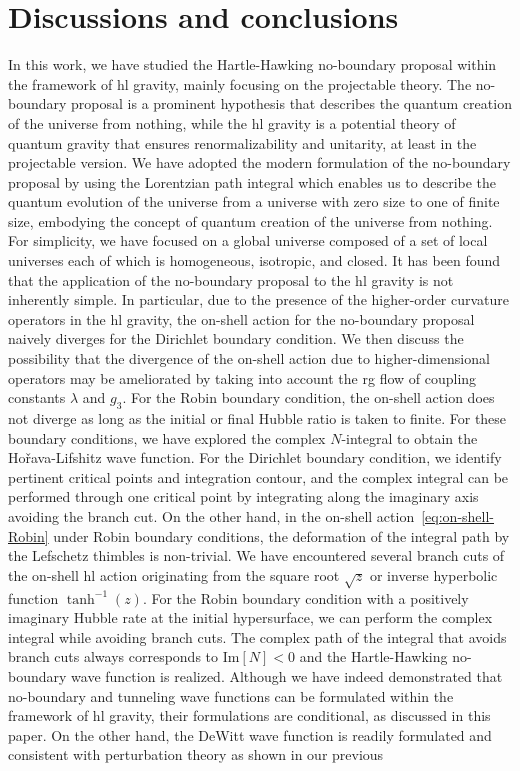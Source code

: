\documentclass[superscriptaddress,aps,preprintnumbers,nofootinbib]{revtex4-2}
\begin{document}
\section{Discussions and conclusions}
\label{sec:discussions-conclusions}

In this work, we have studied the Hartle-Hawking no-boundary proposal within the framework of \ac{hl} gravity, mainly focusing on the projectable theory. The no-boundary proposal is a prominent hypothesis that describes the quantum creation of the universe from nothing, while the \ac{hl} gravity is a potential theory of quantum gravity that ensures renormalizability and unitarity, at least in the projectable version. We have adopted the modern formulation of the no-boundary proposal by using the Lorentzian path integral which enables us to describe the quantum evolution of the universe from a universe with zero size to one of finite size, embodying the concept of quantum creation of the universe from nothing. For simplicity, we have focused on a global universe composed of a set of local universes each of which is homogeneous, isotropic, and closed. It has been found that the application of the no-boundary proposal to the \ac{hl} gravity is not inherently simple. In particular, due to the presence of the higher-order curvature operators in the \ac{hl} gravity, the on-shell action for the no-boundary proposal naively diverges for the Dirichlet boundary condition. We then discuss the possibility that the divergence of the on-shell action due to higher-dimensional operators may be ameliorated by taking into account the \ac{rg} flow of coupling constants $\lambda$ and $g_{3}$. For the Robin boundary condition, the on-shell action does not diverge as long as the initial or final Hubble ratio is taken to finite. For these boundary conditions, we have explored the complex $N$-integral to obtain the Ho\v{r}ava-Lifshitz wave function. For the Dirichlet boundary condition, we identify pertinent critical points and integration contour, and the complex integral can be performed through one critical point by integrating along the imaginary axis avoiding the branch cut. On the other hand, in the on-shell action~\eqref{eq:on-shell-Robin} under Robin boundary conditions, the deformation of the integral path by the Lefschetz thimbles is non-trivial. We have encountered several branch cuts of the on-shell \ac{hl} action originating from the square root $\sqrt{z}$ or inverse hyperbolic function $\tanh ^{-1}(z)$. For the Robin boundary condition with a positively imaginary Hubble rate at the initial hypersurface, we can perform the complex integral while avoiding branch cuts. The complex path of the integral that avoids branch cuts always corresponds to $\textrm{Im}[N] < 0$ and the Hartle-Hawking no-boundary wave function is realized. Although we have indeed demonstrated that no-boundary and tunneling wave functions can be formulated within the framework of \ac{hl} gravity, their formulations are conditional, as discussed in this paper. On the other hand, the DeWitt wave function is readily formulated and consistent with perturbation theory as shown in our previous 
\end{document}
